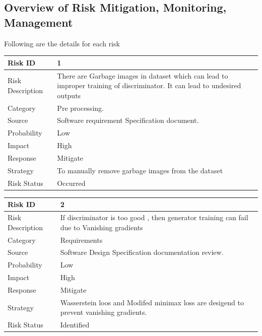 \documentclass[oneside,a4paper,12pt]{report}
\begin{document}
\subsection{Overview of Risk Mitigation, Monitoring, Management}
Following are the details for each risk
\begin{table}[!htbp]
\begin{center}
\def\arraystretch{1.5}
\begin{tabularx}{\textwidth}{| l | X |}
\hline
Risk ID	& 1 \\ \hline
Risk Description	& There are Garbage images in dataset which can lead to improper training of discriminator. It can lead to undesired outputs \\ \hline
Category	& Pre processing. \\ \hline
Source	& Software requirement Specification document. \\ \hline
Probability	& Low \\ \hline
Impact	& High \\ \hline
Response	& Mitigate \\ \hline
Strategy	& To manually remove garbage images from the dataset  \\ \hline
Risk Status	& Occurred \\ \hline
\end{tabularx}
\end{center}
\label{tab:risk1}
\end{table}

\begin{table}[!htbp]
\begin{center}
\def\arraystretch{1.5}
\begin{tabularx}{\textwidth}{| l | X |}
\hline
Risk ID	& 2 \\ \hline
Risk Description	& If discriminator is too good , then generator training can fail due to Vanishing gradients  \\ \hline
Category	& Requirements \\ \hline
Source	& Software Design Specification documentation review. \\ \hline
Probability	& Low \\ \hline
Impact	& High \\ \hline
Response	& Mitigate \\ \hline
Strategy	& Wasserstein loos and Modifed minimax loss are desigend to prevent vanishing gradients.  \\ \hline
Risk Status	& Identified \\ \hline
\end{tabularx}
\end{center}
\label{tab:risk2}
\end{table}
\end{document}
